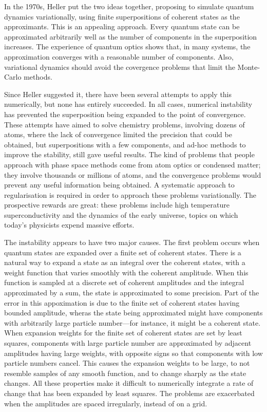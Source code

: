 In the 1970s, Heller put the two ideas together, proposing to simulate quantum dynamics variationally, using finite superpositions of coherent states as the approximants.  This is an appealing approach.  Every quantum state can be approximated arbitrarily well as the number of components in the superposition increases.  The experience of quantum optics shows that, in many systems, the approximation converges with a reasonable number of components.  Also, variational dynamics should avoid the covergence problems that limit the Monte-Carlo methods.


Since Heller suggested it, there have been several attempts to apply this numerically, but none has entirely succeeded.  In all cases, numerical instability has prevented the superposition being expanded to the point of convergence.
These attempts have aimed to solve chemistry problems, involving dozens of atoms, where the lack of convergence limited the precision that could be obtained, but superpositions with a few components, and ad-hoc methods to improve the stability, still gave useful results.  The kind of problems that people approach with phase space methods come from atom optics or condensed matter; they involve thousands or millions of atoms, and the convergence problems would prevent any useful information being obtained.  A systematic approach to regularisation is required in order to approach these problems variationally.  The prospective rewards are great: these problems include high temperature superconductivity and the dynamics of the early universe, topics on which today's physicists expend massive efforts.


The instability appears to have two major causes.  The first problem occurs when quantum states are expanded over a finite set of coherent states.  There is a natural way to expand a state as an integral over the coherent states, with a weight function that varies smoothly with the coherent amplitude.  When this function is sampled at a discrete set of coherent amplitudes and the integral approximated by a sum, the state is approximated to some precision.  Part of the error in this appoximation is due to the finite set of coherent states having bounded amplitude, wheras the state being approximated might have components with arbitrarily large particle number—for instance, it might be a coherent state.  When expansion weights for the finite set of coherent states are set by least squares, components with large particle number are approximated by adjacent amplitudes having large weights, with opposite signs so that components with low particle numbers cancel.  This causes the expansion weights to be large, to not resemble samples of any smooth function, and to change sharply as the state changes.  All these properties make it difficult to numerically integrate a rate of change that has been expanded by least squares.  The problems are exacerbated when the amplitudes are spaced irregularly, instead of on a grid.

